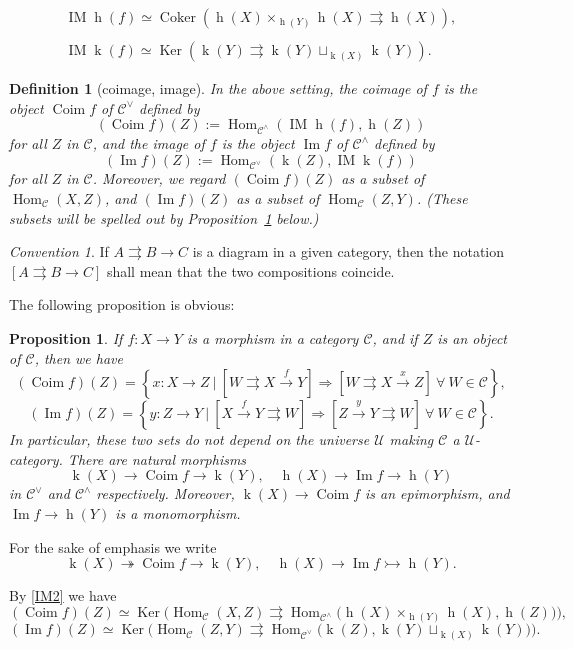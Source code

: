 \documentclass[12pt]{article}
\newtheorem{prop}[thm]{Proposition}
\newtheorem{df}[thm]{Definition}
\theoremstyle{remark}
\newtheorem{conv}[thm]{Convention}
\theoremstyle{definition}
\newcommand{\C}{\mathcal C}
\newcommand{\U}{\mathcal U}
\newcommand{\epi}{\twoheadrightarrow}
\newcommand{\mono}{\rightarrowtail}
\newcommand{\parar}{\rightrightarrows}
\newcommand{\then}{\Rightarrow}
\newcommand{\xr}{\xrightarrow}
\DeclareMathOperator{\Coim}{Coim}
\DeclareMathOperator{\Coker}{Coker}
\DeclareMathOperator{\Ima}{Im}
\DeclareMathOperator{\IM}{IM}
\DeclareMathOperator{\hy}{h}
\DeclareMathOperator{\ky}{k}
\DeclareMathOperator{\Hom}{Hom}
\DeclareMathOperator{\Ker}{Ker}
\begin{document}
\begin{equation}\label{IM2}
\begin{split}
\IM\hy(f)\simeq\Coker(\hy(X)\times_{\hy(Y)}\hy(X)\parar\hy(X)),\\ \\ 
\IM\ky(f)\simeq\Ker(\ky(Y)\parar\ky(Y)\sqcup_{\ky(X)}\ky(Y)).
\end{split}
\end{equation}

\begin{df}[coimage, image]\label{dci}
In the above setting, the {\em coimage} of $f$ is the object $\Coim f$ of $\C^\vee$ defined by 
$$ 
(\Coim f)(Z):=\Hom_{\C^\wedge}(\IM\hy(f),\hy(Z))
$$ 
for all $Z$ in $\C$, and the {\em image} of $f$ is the object $\Ima f$ of $\C^\wedge$ defined by 
$$ 
(\Ima f)(Z):=\Hom_{\C^\vee}(\ky(Z),\IM\ky(f)) 
$$ 
for all $Z$ in $\C$. Moreover, we regard $(\Coim f)(Z)$ as a subset of $\Hom_\C(X,Z)$, and $(\Ima f)(Z)$ as a subset of $\Hom_\C(Z,Y)$. (These subsets will be spelled out by Proposition~\ref{epimono} below.)
\end{df} 

\begin{conv}\label{bra}
If $A\parar B\to C$ is a diagram in a given category, then the notation $[A\parar B\to C]$ shall mean that the two compositions coincide.
\end{conv}

The following proposition is obvious:

\begin{prop}\label{epimono}
If $f:X\to Y$ is a morphism in a category $\C$, and if $Z$ is an object of $\C$, then we have 
$$
(\Coim f)(Z)=\left\{x:X\to Z\ \bigg|\ \left[W\parar X\xr fY\right]\then\left[W\parar X\xr xZ\right]\ \forall\ W\in\C\right\},
$$
$$
(\Ima f)(Z)=\left\{y:Z\to Y\ \bigg|\ \left[X\xr fY\parar W\right]\then\left[Z\xr yY\parar W\right]\ \forall\ W\in\C\right\}.
$$ 
In particular, these two sets do not depend on the universe $\U$ making $\C$ a $\U$\--category. There are natural morphisms 
$$
\ky(X)\to\Coim f\to\ky(Y),\quad\hy(X)\to\Ima f\to\hy(Y)
$$ 
in $\C^\vee$ and $\C^\wedge$ respectively. Moreover, $\ky(X)\to\Coim f$ is an epimorphism, and $\Ima f\to\hy(Y)$ is a monomorphism. 
\end{prop} 

For the sake of emphasis we write
$$
\ky(X)\epi\Coim f\to\ky(Y),\quad\hy(X)\to\Ima f\mono\hy(Y).
$$ 

By \eqref{IM2} we have 
$$ 
(\Coim f)(Z)\simeq\Ker\Big(\Hom_\C(X,Z)\parar\Hom_{\C^\wedge}\big(\hy(X)\times_{\hy(Y)}\hy(X),\hy(Z)\big)\Big), 
$$ 
$$ 
(\Ima f)(Z)\simeq\Ker\Big(\Hom_\C(Z,Y)\parar\Hom_{\C^\vee}\big(\ky(Z),\ky(Y)\sqcup_{\ky(X)}\ky(Y)\big)\Big). 
$$
 
\end{document}

